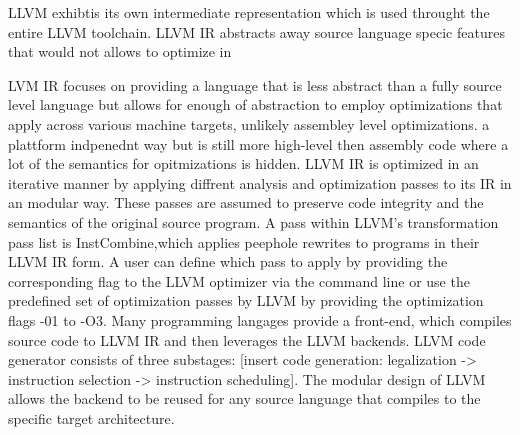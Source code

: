 LLVM exhibtis its own intermediate representation which is used throught the entire LLVM toolchain. LLVM IR abstracts away source language specic features that would not allows to optimize in


LVM IR focuses on providing a language that is less abstract than a fully source level language but allows for enough of abstraction to employ optimizations that apply across various machine targets, unlikely assembley level optimizations.
a plattform indpenednt way but is still more high-level then assembly code where a lot of the semantics for opitmizations is hidden. 
LLVM IR is optimized in an iterative manner by applying diffrent analysis and optimization passes to its IR in an modular way. These passes are assumed to preserve code integrity and the semantics of the original source program. A pass within LLVM's transformation pass list is InstCombine,which applies peephole rewrites to programs in their LLVM IR form. A user can define which pass to apply by providing the corresponding flag to the LLVM optimizer via the command line or use the predefined set of optimization passes by LLVM by providing the optimization flags -01 to -O3.
Many programming langages provide a front-end, which compiles source code to LLVM IR and then leverages the LLVM backends.
LLVM code generator consists of three substages:
[insert code generation: legalization -> instruction selection -> instruction scheduling].
The modular design of LLVM allows the backend to be reused for any source language that compiles to the specific target architecture.


